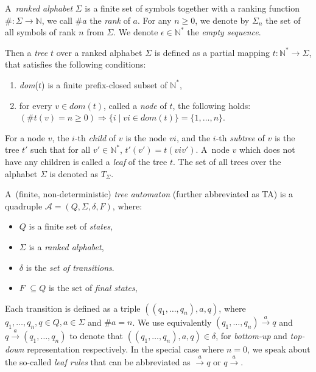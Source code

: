  A~\emph{ranked alphabet} $\Sigma$ is a finite set of symbols together with a
 ranking function $\#: \Sigma \to \mathbb{N}$, we call $\#a$ the \emph{rank}
 of $a$. For any $n \geq 0$, we denote by $\Sigma_n$ the set of all symbols of rank
 $n$ from $\Sigma$. We denote $\epsilon \in \mathbb{N}^*$ the \emph{empty
 sequence}.

Then a \emph{tree} $t$ over a ranked alphabet $\Sigma$ is defined as a partial
mapping $t : \mathbb{N}^* \to \Sigma$, that satisfies the following conditions:
 \begin{enumerate}
  \item \emph{dom}($t$) is a finite prefix-closed subset of $\mathbb{N}^*$,
  \item for every $v \in dom(t)$, called a \emph{node} of $t$, the following
holds: $(\#t(v) = n \geq 0) \Longrightarrow \{i \mid vi \in dom(t)\} =
\{1,\ldots,n\}$.
 \end{enumerate}

For a node $v$, the $i$-th \emph{child} of $v$ is the node $vi$, and the $i$-th
\emph{subtree} of $v$ is the tree $t'$ such that for all $v' \in \mathbb{N}^*$, 
$t'(v') = t(viv')$. A~node $v$ which does not have any children is called a
\emph{leaf} of the tree $t$. The set of all trees over the alphabet $\Sigma$ is
denoted as $T_\Sigma$.

A~(finite, non-deterministic) \emph{tree automaton} (further abbreviated as TA)
is a quadruple $\mathcal{A} = (Q, \Sigma, \delta, F)$, where:
 \begin{itemize}
   \item $Q$ is a finite set of \emph{states},
	\item $\Sigma$ is a \emph{ranked alphabet},
	\item $\delta$ is the \emph{set of transitions}.
	\item $F$ $ \subseteq Q$ is the set of \emph{final states},
 \end{itemize}

Each transition is defined as a triple $((q_1,\ldots,q_n), a, q)$, where
$q_1,\ldots,q_n,q \in Q, a \in \Sigma$ and $\#a = n$. We use equivalently
$(q_1,\ldots,q_n) \overset{a}{\longrightarrow} q$ and $q
\overset{a}{\longrightarrow}  (q_1,\ldots,q_n)$ to denote that
$((q_1,\ldots,q_n), a, q) \in \delta$, for \emph{bottom-up} and \emph{top-down}
representation respectively. In the special case where $n = 0$, we speak about
the so-called \emph{leaf rules} that can be abbreviated as
$\overset{a}{\longrightarrow}  q$ or $q \overset{a}{\longrightarrow} $.

